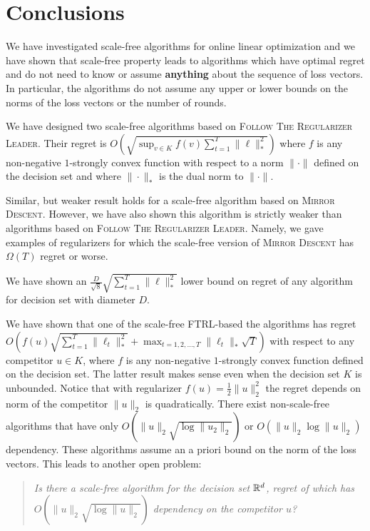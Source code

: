 \section{Conclusions}
\label{section:conclusions}

We have investigated scale-free algorithms for online linear optimization and
we have shown that scale-free property leads to algorithms which have optimal
regret and do not need to know or assume \textbf{anything} about the sequence
of loss vectors. In particular, the algorithms do not assume any upper or lower
bounds on the norms of the loss vectors or the number of rounds.

We have designed two scale-free algorithms based on \textsc{Follow The
Regularizer Leader}.  Their regret is $O \left(\sqrt{\sup_{v \in K} f(v)
\sum_{t=1}^T \|\ell\|_*^2} \right)$ where $f$ is any non-negative $1$-strongly
convex function with respect to a norm $\|\cdot\|$ defined on the decision set
and where $\|\cdot\|_*$ is the dual norm to $\|\cdot\|$.

Similar, but weaker result holds for a scale-free algorithm based on
\textsc{Mirror Descent}. However, we have also shown this algorithm is strictly
weaker than algorithms based on \textsc{Follow The Regularizer Leader}. Namely,
we gave examples of regularizers for which the scale-free version of
\textsc{Mirror Descent} has $\Omega(T)$ regret or worse.

We have shown an $\frac{D}{\sqrt{8}} \sqrt{\sum_{t=1}^T \|\ell\|_*^2}$
lower bound on regret of any algorithm for decision set with diameter $D$.

We have shown that one of the scale-free \textsc{FTRL}-based the algorithms has
regret $O \left(f(u) \sqrt{\sum_{t=1}^T \|\ell_t\|_*^2} + \max_{t=1,2,\dots,T}
\|\ell_t\|_* \sqrt{T} \right)$ with respect to any competitor $u \in K$, where
$f$ is any non-negative $1$-strongly convex function defined on the decision
set.  The latter result makes sense even when the decision set $K$ is
unbounded. Notice that with regularizer $f(u) = \frac{1}{2}\|u\|_2^2$ the
regret depends on norm of the competitor $\|u\|_2$ is quadratically. There
exist non-scale-free algorithms \cite{McMahan-Streeter-2012,
McMahan-Abernethy-2013, Orabona-2013, McMahan-Orabona-2014, Orabona-2014} that
have only $O(\|u\|_2 \sqrt{\log \|u_2\|_2})$ or $O(\|u\|_2 \log \|u\|_2)$
dependency.  These algorithms assume an a priori bound on the norm of the loss
vectors.  This leads to another open problem:
%
\begin{quotation}
\noindent
\emph{Is there a scale-free algorithm for the decision set $\mathbb{R}^d$, regret of
which has $O(\|u\|_2 \sqrt{\log \|u\|_2})$ dependency on the competitor $u$?}
\end{quotation}

